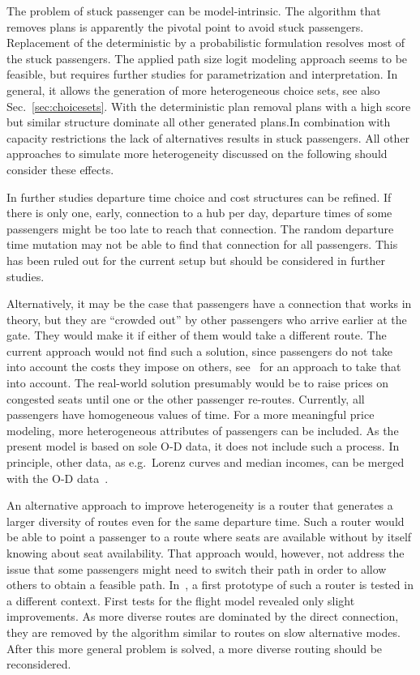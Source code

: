 The problem of stuck passenger can be model-intrinsic. 
The algorithm that removes plans is apparently the pivotal point to avoid stuck passengers. 
Replacement of the deterministic by a probabilistic formulation resolves most of the stuck passengers. 
The applied path size logit modeling approach seems to be feasible, but requires further studies for parametrization and interpretation. 
In general, it allows the generation of more heterogeneous choice sets, see also Sec.~\ref{sec:choicesets}. 
With the deterministic plan removal plans with a high score but similar structure dominate all other generated plans.In combination with capacity restrictions the lack of alternatives results in stuck passengers.  
All other approaches to simulate more heterogeneity discussed on the following should consider these effects.  

In further studies departure time choice and cost structures can be refined. 
If there is only one, early, connection to a hub per day, departure times of some passengers might be too late to reach that connection. 
The random departure time mutation may not be able to find that connection for all passengers. 
This has been ruled out for the current setup but should be considered in further studies. 

Alternatively, it may be the case that passengers have a connection that works in theory, but they are ``crowded out'' by other passengers who arrive earlier at the gate.  
They would make it if either of them would take a different route.  
The current approach would not find such a solution, since passengers do not take into account the costs they impose on others, see~\citet{LaemmelFloetteroed2009KISysOptEvac} for an approach to take that into account.  
The real-world solution presumably would be to raise prices on congested seats until one or the other passenger re-routes. 
Currently, all passengers have homogeneous values of time.   
For a more meaningful price modeling, more heterogeneous attributes of passengers can be included. 
As the present model is based on sole O-D data, it does not include such a process. 
In principle, other data, as e.g.~Lorenz curves and median incomes, can be merged with the O-D data~\citep{KickhoeferEtAl2011PolicyEvaluationIncome}.  

An alternative approach to improve heterogeneity is a router that generates a larger diversity of routes even for the same departure time.  
Such a router would be able to point a passenger to a route where seats are available without by itself knowing about seat availability.  
That approach would, however, not address the issue that some passengers might need to switch their path in order to allow others to obtain a feasible path. 
In~\citet{Graf2013Da}, a first prototype of such a router is tested in a different context. 
First tests for the flight model revealed only slight improvements. 
As more diverse routes are dominated by the direct connection, they are removed by the algorithm similar to routes on slow alternative modes. 
After this more general problem is solved, a more diverse routing should be reconsidered. 

